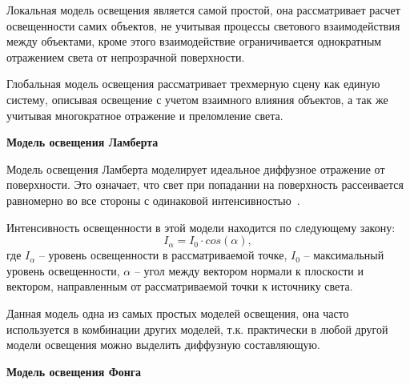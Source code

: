 Локальная модель освещения является самой простой, она рассматривает расчет освещенности самих объектов, не учитывая процессы светового взаимодействия между объектами, кроме этого взаимодействие ограничивается однократным отражением света от непрозрачной поверхности.

Глобальная модель освещения рассматривает трехмерную сцену как единую систему, описывая освещение с учетом взаимного влияния объектов, а так же учитывая многократное отражение и преломление света.

\textbf{Модель освещения Ламберта}

Модель освещения Ламберта моделирует идеальное диффузное отражение от поверхности. Это означает, что свет при попадании на поверхность рассеивается равномерно во все стороны с одинаковой интенсивностью~\cite{rodgers}.

Интенсивность освещенности в этой модели находится по следующему закону:
\begin{equation}
	I_{\alpha} = I_0\cdot cos(\alpha),	
\end{equation}
где $I_{\alpha}$ -- уровень освещенности в рассматриваемой точке, $I_0$ -- максимальный уровень освещенности, $\alpha$ -- угол между вектором нормали к плоскости и вектором, направленным от рассматриваемой точки к источнику света.

Данная модель одна из самых простых моделей освещения, она часто используется в комбинации других моделей, т.к. практически в любой другой модели освещения можно выделить диффузную составляющую.

\textbf{Модель освещения Фонга}

